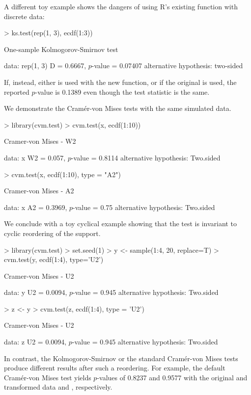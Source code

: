 A different toy example shows the dangers of using R's existing
 function with discrete data:
\begin{Schunk}
\begin{Sinput}
> ks.test(rep(1, 3), ecdf(1:3))
\end{Sinput}
\begin{Soutput}
	One-sample Kolmogorov-Smirnov test

data:  rep(1, 3) 
D = 0.6667, $p$-value = 0.07407
alternative hypothesis: two-sided 
\end{Soutput}
\end{Schunk}
If, instead, either  is used with the new
 function, or if the original 
is used, the reported $p$-value is 0.1389 even though the test statistic
is the same.

We demonstrate the Cram\'{e}r-von Mises tests with the same
simulated data. 
\begin{Schunk}
\begin{Sinput}
> library(cvm.test)
> cvm.test(x, ecdf(1:10))
\end{Sinput}
\begin{Soutput}
	Cramer-von Mises - W2

data:  x 
W2 = 0.057, $p$-value = 0.8114
alternative hypothesis: Two.sided 
\end{Soutput}
\begin{Sinput}
> cvm.test(x, ecdf(1:10), type = "A2")
\end{Sinput}
\begin{Soutput}
	Cramer-von Mises - A2

data:  x 
A2 = 0.3969, $p$-value = 0.75
alternative hypothesis: Two.sided 
\end{Soutput}
\end{Schunk}

We conclude with a toy cyclical example showing that the test is
invariant to cyclic reordering of the support.
\begin{Schunk}
\begin{Sinput}
> library(cvm.test)
> set.seed(1)
> y <- sample(1:4, 20, replace=T)
> cvm.test(y, ecdf(1:4), type='U2')
\end{Sinput}
\begin{Soutput}
	Cramer-von Mises - U2

data:  y 
U2 = 0.0094, $p$-value = 0.945
alternative hypothesis: Two.sided 
\end{Soutput}
\begin{Sinput}
> z <- y%
> cvm.test(z, ecdf(1:4), type = 'U2')
\end{Sinput}
\begin{Soutput}
	Cramer-von Mises - U2

data:  z 
U2 = 0.0094, $p$-value = 0.945
alternative hypothesis: Two.sided 
\end{Soutput}
\end{Schunk}
In contrast, the Kolmogorov-Smirnov or the standard Cram\'{e}r-von Mises tests
produce different results after such a reordering. For example, the default
Cram\'{e}r-von Mises test yields $p$-values of 0.8237 and 0.9577 with the original
and transformed data  and , respectively.

